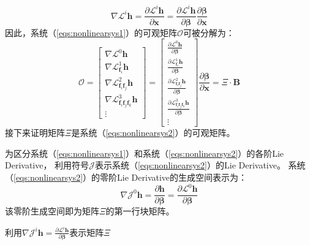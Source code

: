 \documentclass{article}
\begin{document}
\begin{equation}
    \nabla\mathcal{L}^i\textbf{h}=\frac{\partial\mathcal{L}^i\textbf{h}}{\partial{\textbf{x}}}
    =\frac{\partial\mathcal{L}^i\textbf{h}}{\partial\mathcal{\mathbf{\beta}}}\frac{\partial\mathbf{\beta}}{\partial{\textbf{x}}}
\end{equation}
因此，系统（\ref{eqs:nonlinearsys1}）的可观矩阵$\mathcal{O}$可被分解为：
\begin{equation}
    \mathcal{O}
    =\left[ \begin{array}{c}
        \nabla\mathcal{L}^0\textbf{h}\\
        \nabla\mathcal{L}_{\textbf{f}_i}^{1}\textbf{h}\\
        \nabla\mathcal{L}_{\textbf{f}_i\textbf{f}_j}^{2}\textbf{h}\\
        \nabla\mathcal{L}_{\textbf{f}_i\textbf{f}_j\textbf{f}_k}^{3}\textbf{h}\\
        \vdots
    \end{array}\right]
    =\left[ \begin{array}{c}
        \frac{\partial\mathcal{L}^0\textbf{h}}{\partial\mathbf{\beta}}\\
        \frac{\partial\mathcal{L}^1_{\textbf{f}_i}\textbf{h}}{\partial\mathbf{\beta}}\\
        \frac{\partial\mathcal{L}^2_{\textbf{f}_i\textbf{f}_j}\textbf{h}}{\partial\mathbf{\beta}}\\
        \frac{\partial\mathcal{L}^3_{\textbf{f}_i\textbf{f}_j\textbf{f}_k}\textbf{h}}{\partial\mathbf{\beta}}\\
        \vdots
    \end{array}\right]\frac{\partial\mathbf{\beta}}{\partial\textbf{x}}
    =\Xi\cdot\textbf{B}
\end{equation}
接下来证明矩阵$\Xi$是系统（\ref{eqs:nonlinearsys2}）的可观矩阵。
\par
为区分系统（\ref{eqs:nonlinearsys1}）和系统（\ref{eqs:nonlinearsys2}）的各阶Lie Derivative，
利用符号$\mathcal{J}$表示系统（\ref{eqs:nonlinearsys2}）的Lie Derivative。
系统（\ref{eqs:nonlinearsys2}）的零阶Lie Derivative的生成空间表示为：
\begin{equation}
    \nabla\mathcal{J}^0\textbf{h}=\frac{\partial\textbf{h}}{\partial\mathbf{\beta}}
    =\frac{\partial\mathcal{L}^0\textbf{h}}{\partial\mathbf{\beta}}
\end{equation}
该零阶生成空间即为矩阵$\Xi$的第一行块矩阵。
\par
利用$\nabla\mathcal{J}^i\textbf{h}=\frac{\partial\mathcal{L}^i\textbf{h}}{\partial\mathbf{\beta}}$表示矩阵$\Xi$
\end{document}
